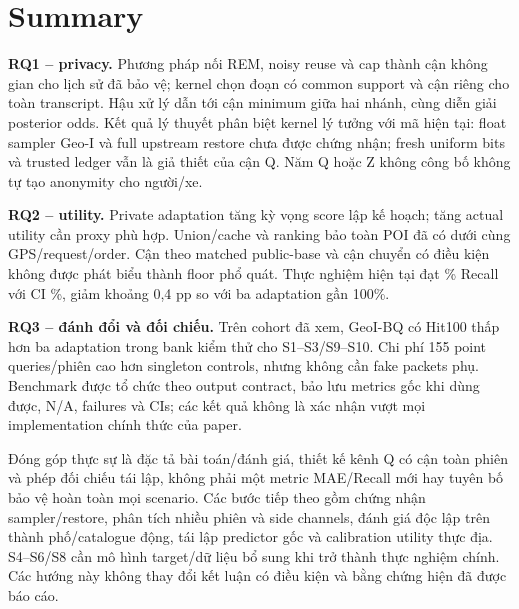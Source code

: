 \section{Summary}
\textbf{RQ1 -- privacy.} Phương pháp nối REM, noisy reuse và cap thành cận không gian cho lịch sử đã bảo vệ;
kernel chọn đoạn có common support và cận riêng cho toàn transcript. Hậu xử lý dẫn tới cận minimum giữa
hai nhánh, cùng diễn giải posterior odds. Kết quả lý thuyết phân biệt kernel lý tưởng với mã hiện tại:
float sampler Geo-I và full upstream restore chưa được chứng nhận; fresh uniform bits và trusted ledger
vẫn là giả thiết của cận Q. Năm Q hoặc Z không công bố không tự tạo anonymity cho người/xe.

\textbf{RQ2 -- utility.} Private adaptation tăng kỳ vọng score lập kế hoạch; tăng actual utility cần proxy phù hợp.
Union/cache và ranking bảo toàn POI đã có dưới cùng GPS/request/order. Cận theo matched public-base
và cận chuyển có điều kiện không được phát biểu thành floor phổ quát. Thực nghiệm hiện tại đạt
\PrimaryRecall\% Recall với CI \PrimaryCI\%, giảm khoảng 0,4 pp so với ba adaptation gần 100\%.

\textbf{RQ3 -- đánh đổi và đối chiếu.} Trên cohort đã xem, GeoI-BQ có Hit100 thấp hơn ba adaptation trong
bank kiểm thử cho S1--S3/S9--S10. Chi phí 155 point queries/phiên cao hơn singleton controls, nhưng không
cần fake packets phụ. Benchmark được tổ chức theo output contract, bảo lưu metrics gốc khi dùng được,
N/A, failures và CIs; các kết quả không là xác nhận vượt mọi implementation chính thức của paper.

Đóng góp thực sự là đặc tả bài toán/đánh giá, thiết kế kênh Q có cận toàn phiên và phép đối chiếu tái lập,
không phải một metric MAE/Recall mới hay tuyên bố bảo vệ hoàn toàn mọi scenario.
Các bước tiếp theo gồm chứng nhận sampler/restore, phân tích nhiều phiên và side channels,
đánh giá độc lập trên thành phố/catalogue động, tái lập predictor gốc và calibration utility thực địa.
S4--S6/S8 cần mô hình target/dữ liệu bổ sung khi trở thành thực nghiệm chính. Các hướng này không
thay đổi kết luận có điều kiện và bằng chứng hiện đã được báo cáo.
